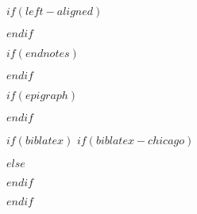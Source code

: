 
\usepackage{etoolbox}


$if(left-aligned)$
\usepackage[document]{ragged2e}
\setlength{\RaggedRightParindent}{\parindent}
\setlength{\RaggedRightRightskip}{0pt plus 3em}
$endif$

$if(endnotes)$
\usepackage{endnotes}
\renewcommand{\enotesize}{\normalsize}
\let\footnote=\endnote
$endif$


\usepackage{fancyhdr}
\setlength{\headheight}{0.25in}
\renewcommand{\headrulewidth}{0pt}  %
\renewcommand{\footrulewidth}{0pt}



\pagestyle{normal}


$if(epigraph)$
\usepackage{epigraph}
\renewcommand{\epigraphsize}{\footnotesize}
\setlength{\epigraphrule}{0em}
\setlength{\beforeepigraphskip}{0em}
\setlength{\afterepigraphskip}{1em}
$endif$

$if(biblatex)$
$if(biblatex-chicago)$
\usepackage[$if(biblio-style)$$biblio-style$,$endif$$for(biblatexoptions)$$biblatexoptions$$sep$,$endfor$]{biblatex-chicago}
$else$
\usepackage[$if(biblio-style)$style=$biblio-style$,$endif$$for(biblatexoptions)$$biblatexoptions$$sep$,$endfor$]{biblatex}
$endif$

\setlength\bibitemsep{0pt}  %
\setlength\bibhang{\parindent}  %




\pretocmd{\printbibliography}{\clearpage}{}{}
$endif$

